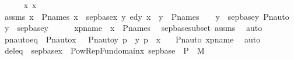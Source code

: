 \begin{isabellebody}
\ \ \ \ \isamarkupfalse%
\ x{}\ x\ \isamarkupfalse%
\ assms{}{\isacharcolon}{\kern0pt}\ {\isachardoublequoteopen}x{}\ {\isasymin}\ P{\isacharunderscore}{\kern0pt}names{\isachardoublequoteclose}\ {\isachardoublequoteopen}x\ {\isasymin}\ sep{\isacharunderscore}{\kern0pt}base{\isacharparenleft}{\kern0pt}x{}{\isacharparenright}{\kern0pt}{\isachardoublequoteclose}\ {\isachardoublequoteopen}{\isasymAnd}y{}{\isachardot}{\kern0pt}\ ed{\isacharparenleft}{\kern0pt}y{}{\isacharcomma}{\kern0pt}\ x{}{\isacharparenright}{\kern0pt}\ {\isasymLongrightarrow}\ y{}\ {\isasymin}\ P{\isacharunderscore}{\kern0pt}names\ {\isasymlongrightarrow}\ {\isacharparenleft}{\kern0pt}\ {\isasymforall}\ y\ {\isasymin}\ sep{\isacharunderscore}{\kern0pt}base{\isacharparenleft}{\kern0pt}y{}{\isacharparenright}{\kern0pt}{\isachardot}{\kern0pt}\ Pn{\isacharunderscore}{\kern0pt}auto{\isacharparenleft}{\kern0pt}{\isasympi}{\isacharparenright}{\kern0pt}\ {\isacharbackquote}{\kern0pt}\ y\ {\isasymin}\ sep{\isacharunderscore}{\kern0pt}base{\isacharparenleft}{\kern0pt}y{}{\isacharparenright}{\kern0pt}{\isacharparenright}{\kern0pt}{\isachardoublequoteclose}\isanewline
\isanewline
\ \ \ \ \isamarkupfalse%
\ xpname\ {\isacharcolon}{\kern0pt}\ {\isachardoublequoteopen}x\ {\isasymin}\ P{\isacharunderscore}{\kern0pt}names{\isachardoublequoteclose}\ \isamarkupfalse%
\ sep{\isacharunderscore}{\kern0pt}base{\isacharunderscore}{\kern0pt}subset\ assms{}\ \isamarkupfalse%
\ auto\ \isanewline
\ \ \ \ \isamarkupfalse%
\ pnautoeq\ {\isacharcolon}{\kern0pt}\ {\isachardoublequoteopen}Pn{\isacharunderscore}{\kern0pt}auto{\isacharparenleft}{\kern0pt}{\isasympi}{\isacharparenright}{\kern0pt}{\isacharbackquote}{\kern0pt}x\ {\isacharequal}{\kern0pt}\ {\isacharbraceleft}{\kern0pt}\ {\isacharless}{\kern0pt}Pn{\isacharunderscore}{\kern0pt}auto{\isacharparenleft}{\kern0pt}{\isasympi}{\isacharparenright}{\kern0pt}{\isacharbackquote}{\kern0pt}y{\isacharcomma}{\kern0pt}\ {\isasympi}{\isacharbackquote}{\kern0pt}p{\isachargreater}{\kern0pt}\ {\isachardot}{\kern0pt}\ {\isacharless}{\kern0pt}y{\isacharcomma}{\kern0pt}\ p{\isachargreater}{\kern0pt}\ {\isasymin}\ x\ {\isacharbraceright}{\kern0pt}{\isachardoublequoteclose}\ \isamarkupfalse%
\ Pn{\isacharunderscore}{\kern0pt}auto\ xpname\ \isamarkupfalse%
\ auto\isanewline
\ \ \ \ \isamarkupfalse%
\ deleq\ {\isacharcolon}{\kern0pt}\ {\isachardoublequoteopen}sep{\isacharunderscore}{\kern0pt}base{\isacharparenleft}{\kern0pt}x{}{\isacharparenright}{\kern0pt}\ {\isacharequal}{\kern0pt}\ Pow{\isacharparenleft}{\kern0pt}{\isasymUnion}RepFun{\isacharparenleft}{\kern0pt}domain{\isacharparenleft}{\kern0pt}x{}{\isacharparenright}{\kern0pt}{\isacharcomma}{\kern0pt}\ sep{\isacharunderscore}{\kern0pt}base{\isacharparenright}{\kern0pt}\ {\isasymtimes}\ P{\isacharparenright}{\kern0pt}\ {\isasyminter}\ M{\isachardoublequoteclose}\isanewline

\end{isabellebody}
